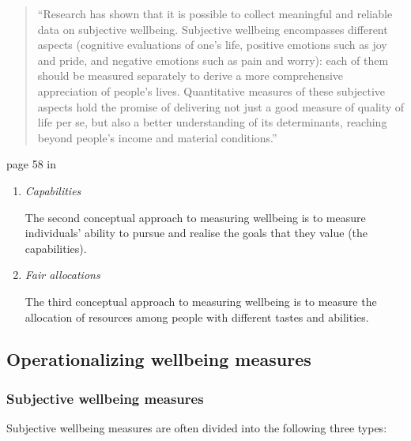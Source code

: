 \documentclass[
]{book}
\begin{document}
\begin{quote}
``Research has shown that it is possible to collect meaningful and reliable data on
subjective wellbeing. Subjective wellbeing encompasses different aspects (cognitive
evaluations of one's life, positive emotions such as joy and pride, and negative emotions such as pain and worry): each of them should be measured separately to derive a more comprehensive appreciation of people's lives. Quantitative measures of these subjective aspects hold the promise of delivering not just a good measure of quality of life per se, but also a better understanding of its determinants, reaching beyond people's income and material conditions.''
\end{quote}

page 58 in \citep{stiglitz2010report}

\begin{enumerate}
\def\labelenumi{\arabic{enumi}.}
\setcounter{enumi}{1}
\item
  \emph{Capabilities}

  The second conceptual approach to measuring wellbeing is to measure individuals' ability to pursue and realise the goals that they value (the capabilities).
\item
  \emph{Fair allocations}

  The third conceptual approach to measuring wellbeing is to measure the allocation of resources among people with different tastes and abilities.
\end{enumerate}

\hypertarget{operationalizing-wellbeing-measures}{%
\subsection*{Operationalizing wellbeing measures}\label{operationalizing-wellbeing-measures}}

\hypertarget{subjective-wellbeing-measures}{%
\subsubsection*{Subjective wellbeing measures}\label{subjective-wellbeing-measures}}

Subjective wellbeing measures are often divided into the following three types:
\end{document}
